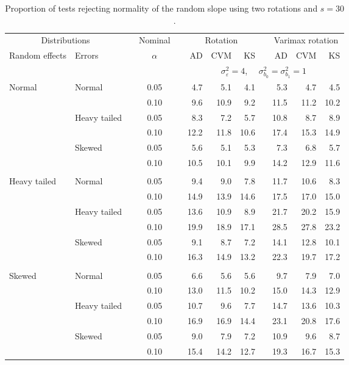 \begin{table}[ht]
\centering
\caption{\label{tab:fixedsimb130} Proportion of tests rejecting normality of the random slope using two rotations and $s = 30$.}
\begin{scriptsize}
\begin{tabular}{ll p{.1cm} c p{.1cm} rrr p{.1cm} rrr}
  \hline
  \multicolumn{2}{c}{Distributions}& & Nominal & &  \multicolumn{3}{c}{Rotation} & & \multicolumn{3}{c}{Varimax rotation} \\ \cline{1-2} \cline{6-8} \cline{10-12}   
  Random effects & Errors & & $\alpha$ & & AD & CVM & KS & & AD & CVM & KS \\ 
   \hline
& && && \multicolumn{7}{c}{$\sigma_{\varepsilon}^2 = 4$, \ \ $\sigma_{b_0}^2 = \sigma_{b_1}^2 = 1$} \\ \cline{6-12}
\rowcolor{gray!20} Normal & Normal &  & 0.05 &  & 4.7 & 5.1 & 4.1 &  & 5.3 & 4.7 & 4.5 \\ 
\rowcolor{gray!20}    &  &  & 0.10 &  & 9.6 & 10.9 & 9.2 &  & 11.5 & 11.2 & 10.2 \\ 
\rowcolor{gray!20}    & Heavy tailed &  & 0.05 &  & 8.3 & 7.2 & 5.7 &  & 10.8 & 8.7 & 8.9 \\ 
\rowcolor{gray!20}    &  &  & 0.10 &  & 12.2 & 11.8 & 10.6 &  & 17.4 & 15.3 & 14.9 \\ 
\rowcolor{gray!20}    & Skewed &  & 0.05 &  & 5.6 & 5.1 & 5.3 &  & 7.3 & 6.8 & 5.7 \\ 
\rowcolor{gray!20}    &  &  & 0.10 &  & 10.5 & 10.1 & 9.9 &  & 14.2 & 12.9 & 11.6 \\ 
&&&&&&&&&&&\\
  Heavy tailed & Normal &  & 0.05 &  & 9.4 & 9.0 & 7.8 &  & 11.7 & 10.6 & 8.3 \\ 
   &  &  & 0.10 &  & 14.9 & 13.9 & 14.6 &  & 17.5 & 17.0 & 15.0 \\ 
   & Heavy tailed &  & 0.05 &  & 13.6 & 10.9 & 8.9 &  & 21.7 & 20.2 & 15.9 \\ 
   &  &  & 0.10 &  & 19.9 & 18.9 & 17.1 &  & 28.5 & 27.8 & 23.2 \\ 
   & Skewed &  & 0.05 &  & 9.1 & 8.7 & 7.2 &  & 14.1 & 12.8 & 10.1 \\ 
   &  &  & 0.10 &  & 16.3 & 14.9 & 13.2 &  & 22.3 & 19.7 & 17.2 \\ 
&&&&&&&&&&&\\
  Skewed & Normal &  & 0.05 &  & 6.6 & 5.6 & 5.6 &  & 9.7 & 7.9 & 7.0 \\ 
   &  &  & 0.10 &  & 13.0 & 11.5 & 10.2 &  & 15.0 & 14.3 & 12.9 \\ 
   & Heavy tailed &  & 0.05 &  & 10.7 & 9.6 & 7.7 &  & 14.7 & 13.6 & 10.3 \\ 
   &  &  & 0.10 &  & 16.9 & 16.9 & 14.4 &  & 23.1 & 20.8 & 17.6 \\ 
   & Skewed &  & 0.05 &  & 9.0 & 7.9 & 7.2 &  & 10.9 & 9.6 & 8.7 \\ 
   &  &  & 0.10 &  & 15.4 & 14.2 & 12.7 &  & 19.3 & 16.7 & 15.3 \\ 


\end{tabular}
\end{scriptsize}
\end{table}
